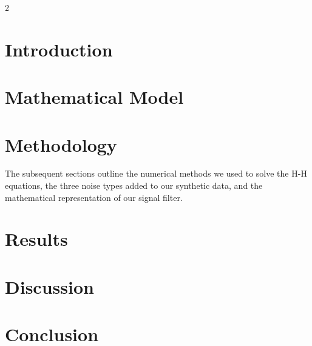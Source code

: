 \documentclass{article} %
\begin{document}
\begin{multicols}{2}
\section{Introduction}
\label{sec:introduction}


\section{Mathematical Model}
\label{sec:mathematical-model}


\section{Methodology}
\label{sec:methodology}

    The subsequent sections outline the numerical methods we used to solve the H-H equations, 
    the three noise types added to our synthetic data, and the mathematical representation of our signal filter.



\section{Results}
\label{sec:results}


\section{Discussion}
\label{sec:discussion}


\section{Conclusion}
\label{sec:conclusion}

    
\label{last_page}





\end{multicols}
\end{document}
